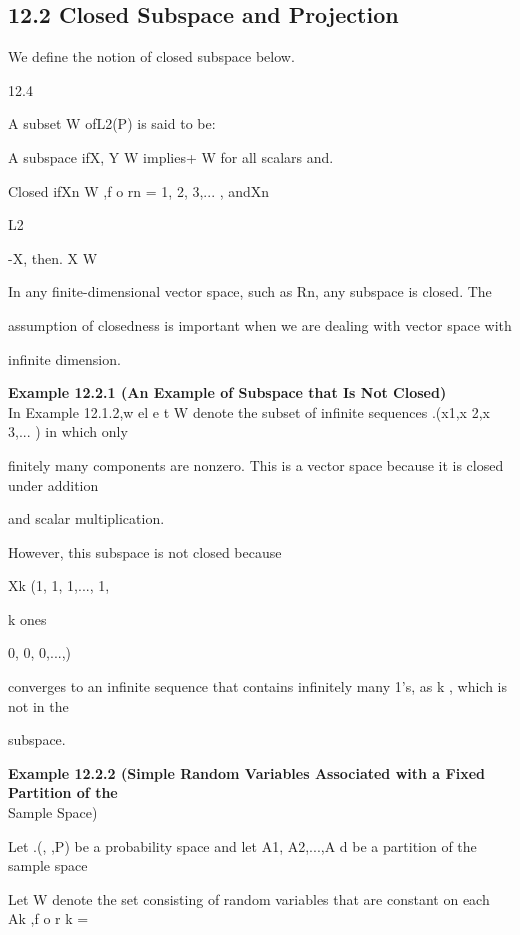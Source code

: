 \subsection*{12.2 Closed Subspace and Projection}

We define the notion of closed subspace below.

\begin{defbox}{12.4}
\end{defbox}

A subset W ofL2(P) is said to be:

A subspace ifX, Y \in W implies\alphaX + \betaY \in W for all scalars \alpha and. \beta

Closed ifXn \in W ,f o rn = 1, 2, 3,... , andXn

L2

-\to X, then. X \in W

In any finite-dimensional vector space, such as Rn, any subspace is closed. The

assumption of closedness is important when we are dealing with vector space with

infinite dimension.

\textbf{Example 12.2.1 (An Example of Subspace that Is Not Closed)} \\

In Example 12.1.2,w el e t W denote the subset of infinite sequences .(x1,x 2,x 3,... ) in which only

finitely many components are nonzero. This is a vector space because it is closed under addition

and scalar multiplication.

However, this subspace is not closed because

Xk \coloneqq(1, 1, 1,..., 1,

k ones

0, 0, 0,...,)

converges to an infinite sequence that contains infinitely many 1's, as k \to\infty , which is not in the

subspace.

\textbf{Example 12.2.2 (Simple Random Variables Associated with a Fixed Partition of the} \\

Sample Space)

Let .(\Omega, ,P) be a probability space and let A1, A2,...,A d be a partition of the sample space

\Omega Let W denote the set consisting of random variables that are constant on each Ak ,f o r k =


